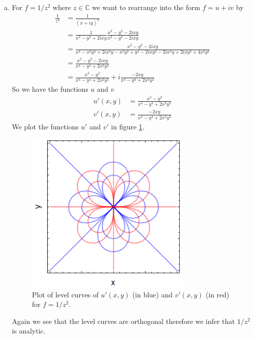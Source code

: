 \documentclass[11pt]{article}
\numberwithin{equation}{section}
\begin{document}
\begin{enumerate}[(a)]
\item For $f=1/z^2$ where $z\in\mathbb{C}$ we want to rearrange into the form $f=u+iv$ by
\begin{align*}
\frac{1}{z^2} &= \frac{1}{(x+iy)^2}\\
&= \frac{1}{x^2-y^2+2ixy}\frac{x^2-y^2-2ixy}{x^2-y^2-2ixy}\\
&= \frac{x^2-y^2-2ixy}{x^4-x^2y^2+2ix^3y - x^2y^2+y^4-2ixy^3 - 2ix^3y+2ixy^3+4x^2y^2}\\
&= \frac{x^2-y^2-2ixy}{x^4-y^4+2x^2y^2}\\
&= \frac{x^2-y^2}{x^4-y^4+2x^2y^2} + i\frac{-2xy}{x^4-y^4+2x^2y^2}
\end{align*}
So we have the functions $u$ and $v$
\begin{align*}
u'(x,y) &= \frac{x^2-y^2}{x^4-y^4+2x^2y^2} \\
v'(x,y) &=  \frac{-2xy}{x^4-y^4+2x^2y^2}
\end{align*}
We plot the functions $u'$ and $v'$ in figure \ref{Fig2}.
\begin{figure}
\centering
\includegraphics[width=0.75\textwidth]{Figure2.png}
\caption{Plot of level curves of $u'(x,y)$ (in blue) and $v'(x,y)$ (in red) for $f=1/z^2$.}
\label{Fig2}
\end{figure}
Again we see that the level curves are orthogonal therefore we infer that $1/z^2$ is analytic.
\end{enumerate}

\pagebreak
\end{document}
